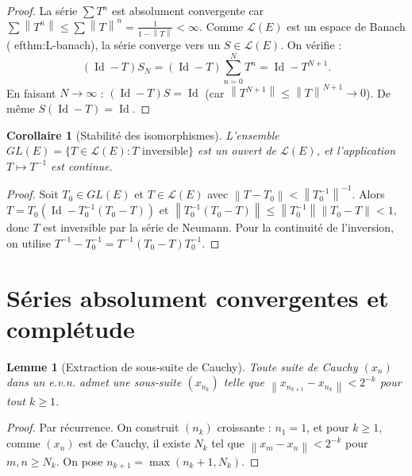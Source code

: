 \documentclass[a4paper,12pt]{book}
\DeclareMathOperator{\Id}{Id}
\newcommand{\norm}[1]{\left\| #1 \right\|}
\theoremstyle{definition}
\theoremstyle{plain}
\newtheorem{lemme}[definition]{Lemme}
\newtheorem{corollaire}[definition]{Corollaire}
\theoremstyle{remark}
\begin{document}
\begin{proof}
La série $\sum T^n$ est absolument convergente car $\sum \norm{T^n} \leq \sum \norm{T}^n = \frac{1}{1-\norm{T}} < \infty$. Comme $\mathcal{L}(E)$ est un espace de Banach (
ef{thm:L-banach}), la série converge vers un $S \in \mathcal{L}(E)$. On vérifie :
\[
    (\Id - T)S_N = (\Id - T)\sum_{n=0}^N T^n = \Id - T^{N+1}.
\]
En faisant $N \to \infty$ : $(\Id - T)S = \Id$ (car $\norm{T^{N+1}} \leq \norm{T}^{N+1} \to 0$). De même $S(\Id - T) = \Id$.
\end{proof}

\begin{corollaire}[Stabilité des isomorphismes]\label{cor:stabilite-iso}
L'ensemble $GL(E) = \{T \in \mathcal{L}(E) : T \text{ inversible}\}$ est un ouvert de $\mathcal{L}(E)$, et l'application $T \mapsto T^{-1}$ est continue.
\end{corollaire}

\begin{proof}
Soit $T_0 \in GL(E)$ et $T \in \mathcal{L}(E)$ avec $\norm{T - T_0} < \norm{T_0^{-1}}^{-1}$. Alors $T = T_0(\Id - T_0^{-1}(T_0 - T))$ et $\norm{T_0^{-1}(T_0 - T)} \leq \norm{T_0^{-1}}\norm{T_0 - T} < 1$, donc $T$ est inversible par la série de Neumann. Pour la continuité de l'inversion, on utilise $T^{-1} - T_0^{-1} = T^{-1}(T_0 - T)T_0^{-1}$.
\end{proof}

\section{Séries absolument convergentes et complétude}

\begin{lemme}[Extraction de sous-suite de Cauchy]\label{lem:extraction-cauchy}
Toute suite de Cauchy $(x_n)$ dans un e.v.n. admet une sous-suite $(x_{n_k})$ telle que $\norm{x_{n_{k+1}} - x_{n_k}} < 2^{-k}$ pour tout $k \geq 1$.
\end{lemme}

\begin{proof}
Par récurrence. On construit $(n_k)$ croissante : $n_1 = 1$, et pour $k \geq 1$, comme $(x_n)$ est de Cauchy, il existe $N_k$ tel que $\norm{x_m - x_n} < 2^{-k}$ pour $m, n \geq N_k$. On pose $n_{k+1} = \max(n_k + 1, N_k)$.
\end{proof}
\end{document}
